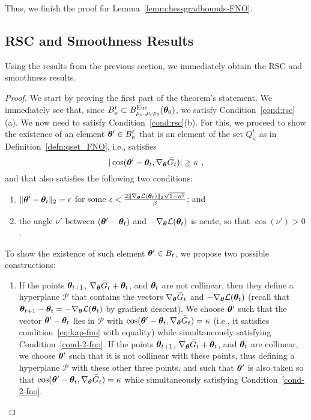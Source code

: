 Thus, we finish the proof for Lemma~\ref{lemm:hessgradbounds-FNO}.

\subsection{RSC and Smoothness Results}

Using the results from the previous section, we immediately obtain the RSC and smoothness results. 

\RSCLossFNO*
%
\begin{proof}
We start by proving the first part of the theorem's statement. 
We immediately see that, 
since $B^t_{\kappa}\subset B^{\mathrm{Euc}}_{\rho_w,\rho_r\rho_1}({\bm{\theta}}_0)$, we satisfy Condition~\ref{cond:rsc}(a). We now need to satisfy Condition~\ref{cond:rsc}(b). For this, we proceed to show the existence of an element ${\bm{\theta}}' \in B^t_{\kappa}$ that is an element of the set $Q^{t}_{\kappa}$ as in Definition~\ref{defn:qset_FNO}, i.e., satisfies
\begin{equation}
|\cos({\bm{\theta}}'-{\bm{\theta}}_t, \nabla_{\bm{\theta}}\bar{G}_t)| \geq \kappa~,
\label{eq:kap-fno}
\end{equation}
and that also satisfies the following two conditions:
\begin{enumerate}[{Condition} (A):]%
\item  $\|{\bm{\theta}}' - {\bm{\theta}}_{t} \|_2 = \epsilon$ for some $\epsilon< \frac{2 \lVert\nabla_{{\bm{\theta}}} {\cal L}({\bm{\theta}}_t)\rVert_2 \sqrt{1-\kappa^2}}{\beta}$; and \label{cond-1-fno}
\item the angle $\nu'$ between $({\bm{\theta}}' - {\bm{\theta}}_{t})$ and $-\nabla_{{\bm{\theta}}} {\cal L}({\bm{\theta}}_t)$ is acute, so that $\cos(\nu') > 0$. \label{cond-2-fno}\end{enumerate}
%

To show the existence of such element ${\bm{\theta}}' \in B_t$, we propose two possible constructions:
\begin{enumerate}[{Choice} (A):]
\item  
If the points ${\bm{\theta}}_{t+1}$, $\nabla_{\bm{\theta}}\bar{G}_t + {\bm{\theta}}_{t}$, and ${\bm{\theta}}_{t}$ are not collinear, then they define a hyperplane $\mathcal{P}$ that contains the vectors $\nabla_{\bm{\theta}}\bar{G}_t$ and $-\nabla_{{\bm{\theta}}} {\cal L}({\bm{\theta}}_t)$ (recall that ${\bm{\theta}}_{t+1} - {\bm{\theta}}_{t}=-\nabla_{{\bm{\theta}}}{\cal L}({\bm{\theta}}_t)$ by gradient descent). We choose ${\bm{\theta}}'$ such that the vector 
${\bm{\theta}}'-{\bm{\theta}}_{t}$ 
lies in 
$\mathcal{P}$ 
with 
$\cos({\bm{\theta}}'-{\bm{\theta}}_{t},\nabla_{\bm{\theta}}\bar{G}_t)=\kappa$ (i.e., it satisfies condition~\eqref{eq:kap-fno} with equality) while simultaneously satisfying Condition~\eqref{cond-2-fno}.
%
%
If the points ${\bm{\theta}}_{t+1}$, $\nabla_{\bm{\theta}}\bar{G}_t + {\bm{\theta}}_{t}$, and ${\bm{\theta}}_{t}$ are collinear, we choose ${\bm{\theta}}'$ such that it is not collinear with these points, thus defining a hyperplane $\mathcal{P}$ 
with these other three points, 
and such that 
${\bm{\theta}}'$ is also taken so that $\cos({\bm{\theta}}'-{\bm{\theta}}_{t},\nabla_{\bm{\theta}}\bar{G}_t)=\kappa$ while simultaneously satisfying Condition~\eqref{cond-2-fno}.
%


\end{enumerate}
\end{proof}
